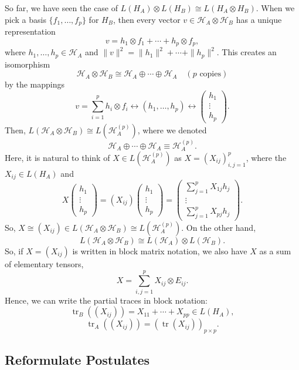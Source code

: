 \documentclass[12pt]{article}
\theoremstyle{definition}
\DeclareMathOperator{\tr}{tr}
\begin{document}
So far, we have seen the case of $L(H_A) \otimes L(H_B) \cong L(H_A \otimes H_B)$. When we pick a basis $\{f_1,\ldots,f_p\}$ for $H_B$, then every vector $v \in \mathcal{H}_A \otimes \mathcal{H}_B$ has a unique representation
\[
v = h_1 \otimes f_1 + \cdots + h_p \otimes f_p,
\]
where $h_1,\ldots,h_p \in \mathcal{H}_A$ and $\|v\|^2 = \|h_1\|^2 + \cdots + \|h_p\|^2$. This creates an isomorphism
\[
\mathcal{H}_A \otimes \mathcal{H}_B \cong \mathcal{H}_A \oplus \cdots \oplus \mathcal{H}_A \quad (p \text{ copies})
\]
by the mappings
\[
v = \sum_{i=1}^p h_i \otimes f_i \leftrightarrow (h_1,\ldots,h_p) \leftrightarrow \begin{pmatrix}h_1\\ \vdots \\ h_p\end{pmatrix}.
\]
Then, $L(\mathcal{H}_A \otimes \mathcal{H}_B) \cong L(\mathcal{H}_A^{(p)})$, where we denoted
\[
\mathcal{H}_A \oplus \cdots \oplus \mathcal{H}_A \equiv \mathcal{H}_A^{(p)}.
\]
Here, it is natural to think of $X \in L(\mathcal{H}_A^{(p)})$ as $X=(X_{ij})_{i,j=1}^p$, where the $X_{ij} \in L(H_A)$ and
\[
X\begin{pmatrix}h_1\\ \vdots \\ h_p\end{pmatrix} = (X_{ij})\begin{pmatrix}h_1\\ \vdots \\ h_p\end{pmatrix} = \begin{pmatrix}\sum_{j=1}^p X_{1j}h_j\\ \vdots \\ \sum_{j=1}^p X_{pj}h_j\end{pmatrix}.
\]
So, $X \cong (X_{ij}) \in L(\mathcal{H}_A \otimes \mathcal{H}_B) \cong L(\mathcal{H}_A^{(p)})$.
On the other hand,
\[
L(\mathcal{H}_A \otimes \mathcal{H}_B) \cong L(\mathcal{H}_A) \otimes L(\mathcal{H}_B).
\]
So, if $X=(X_{ij})$ is written in block matrix notation, we also have $X$ as a sum of elementary tensors,
\[
X = \sum_{i,j=1}^p X_{ij} \otimes E_{ij}.
\]
Hence, we can write the partial traces in block notation:
\[
\tr_B((X_{ij})) = X_{11} + \cdots + X_{pp} \in L(H_A),
\]
\[
\tr_A((X_{ij})) = (\tr(X_{ij}))_{p\times p}.
\]

\subsection{Reformulate Postulates}
\end{document}
